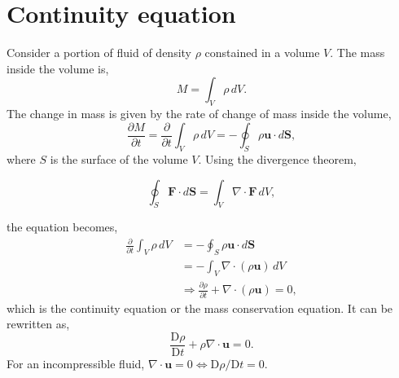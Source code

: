 \section{Continuity equation}
Consider a portion of fluid of density $\rho$ constained in a volume $V$. The mass inside the volume is, 
\begin{equation}
  M = \int_V \rho\,dV. 
\end{equation} 
The change in mass is given by the rate of change of mass inside the volume,
\begin{equation}
  \frac{\partial M}{\partial t} = \frac{\partial}{\partial t}\int_V \rho\,dV = -\oint_S \rho\mathbf{u}\cdot d\mathbf{S},
\end{equation} 
where $S$ is the surface of the volume $V$. Using the divergence theorem, 
\begin{theorem}
\begin{equation}
  \oint_S \mathbf{F}\cdot d\mathbf{S} = \int_V \nabla\cdot\mathbf{F}\,dV, 
\end{equation}
\vspace{-0.5cm}
\end{theorem}
the equation becomes, 
\begin{equation}
  \begin{aligned}
    \frac{\partial}{\partial t}\int_V \rho\,dV &= -\oint_S \rho\mathbf{u}\cdot d\mathbf{S}\\
                                  &= -\int_V \nabla\cdot(\rho\mathbf{u})\,dV\\
                                  &\Rightarrow \frac{\partial \rho}{\partial t} + \nabla\cdot(\rho\mathbf{u}) = 0,
  \end{aligned}
\end{equation}
which is the \textsf{continuity equation} or the \textsf{mass conservation equation}. It can be rewritten as, 
\begin{equation}
  \frac{\text{D}\rho}{\text{D}t} + \rho\nabla\cdot\mathbf{u} = 0. 
\end{equation}
For an \textsf{incompressible fluid}, $\nabla\cdot\mathbf{u} = 0 \Leftrightarrow \text{D}\rho/\text{D}t = 0$.
